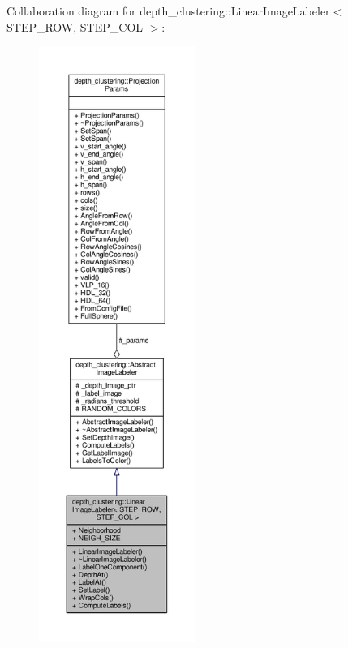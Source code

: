 Collaboration diagram for depth\-\_\-clustering\-:\-:Linear\-Image\-Labeler$<$ S\-T\-E\-P\-\_\-\-R\-O\-W, S\-T\-E\-P\-\_\-\-C\-O\-L $>$\-:
\nopagebreak
\begin{figure}[H]
\begin{center}
\leavevmode
\includegraphics[height=550pt]{classdepth__clustering_1_1LinearImageLabeler__coll__graph}
\end{center}
\end{figure}


